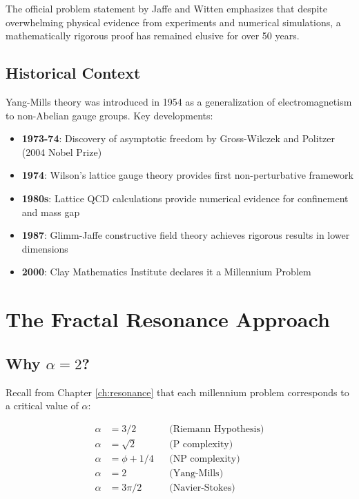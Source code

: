 The official problem statement by Jaffe and Witten\cite{jaffe2006quantum} emphasizes that despite overwhelming physical evidence from experiments and numerical simulations, a mathematically rigorous proof has remained elusive for over 50 years.

\subsection{Historical Context}

Yang-Mills theory was introduced in 1954\cite{yang1954conservation} as a generalization of electromagnetism to non-Abelian gauge groups. Key developments:

\begin{itemize}
\item \textbf{1973-74}: Discovery of asymptotic freedom by Gross-Wilczek\cite{gross1973ultraviolet} and Politzer\cite{politzer1973reliable} (2004 Nobel Prize)
\item \textbf{1974}: Wilson's lattice gauge theory\cite{wilson1974confinement} provides first non-perturbative framework
\item \textbf{1980s}: Lattice QCD calculations\cite{creutz1980monte} provide numerical evidence for confinement and mass gap
\item \textbf{1987}: Glimm-Jaffe constructive field theory\cite{glimm1987quantum} achieves rigorous results in lower dimensions
\item \textbf{2000}: Clay Mathematics Institute declares it a Millennium Problem
\end{itemize}

\section{The Fractal Resonance Approach}

\subsection{Why $\alpha = 2$?}

Recall from Chapter \ref{ch:resonance} that each millennium problem corresponds to a critical value of $\alpha$:

\begin{align}
\alpha &= 3/2 && \text{(Riemann Hypothesis)} \\
\alpha &= \sqrt{2} && \text{(P complexity)} \\
\alpha &= \phi + 1/4 && \text{(NP complexity)} \\
\alpha &= 2 && \text{(Yang-Mills)} \\
\alpha &= 3\pi/2 && \text{(Navier-Stokes)}
\end{align}

